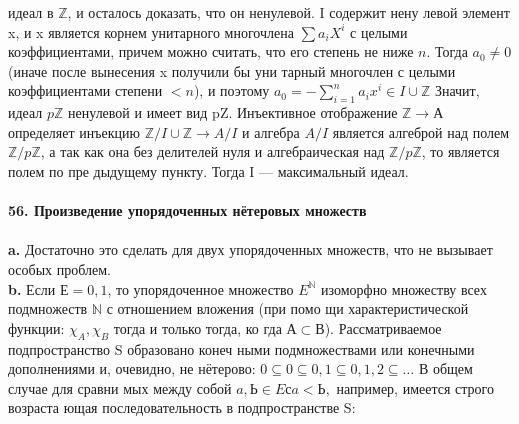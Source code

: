 идеал в $\mathbb{Z}$, и осталось доказать, что он ненулевой. I содержит нену­\linebreak
левой элемент x, и x является корнем унитарного многочлена $\sum a_{i}X^{i}$\linebreak
с целыми коэффициентами, причем можно считать, что его степень\linebreak
не ниже $n$. Тогда $a_0 \neq 0$ (иначе после вынесения x получили бы уни­\linebreak
тарный многочлен с целыми коэффициентами степени $< n$), и поэтому\linebreak
$a_0 = - \sum^{n}_{i = 1}a_{i}x^{i} \in I \cup \mathbb{Z}$ Значит, идеал $p\mathbb{Z}$ ненулевой и имеет вид pZ.\linebreak
Инъективное отображение $\mathbb{Z} \rightarrow А$ определяет инъекцию $\mathbb{Z}/I\cup\mathbb{Z} \rightarrow A/I$\linebreak
и алгебра $A/I$ является алгеброй над полем $\mathbb{Z}/p\mathbb{Z}$, а так как она без\linebreak
делителей нуля и алгебраическая над $\mathbb{Z}/p\mathbb{Z}$, то является полем по пре­\linebreak
дыдущему пункту. Тогда I --- максимальный идеал.\\
\\
\noindent\textbf{56. Произведение упорядоченных нётеровых множеств}\\
\\
\hspace*{15pt}\textbf{a.} Достаточно это сделать для двух упорядоченных множеств, что\linebreak
не вызывает особых проблем.\\
\hspace*{15pt}\textbf{b.} Если $Е = {0,1}$, то упорядоченное множество $E^{\mathbb{N}}$ изоморфно\linebreak
множеству всех подмножеств $\mathbb{N}$ с отношением вложения (при помо­\linebreak
щи характеристической функции: $\chi_A, \chi_B$ тогда и только тогда, ко­\linebreak
гда $А \subset В$). Рассматриваемое подпространство S образовано конеч­\linebreak
ными подмножествами или конечными дополнениями и, очевидно, не\linebreak
нётерово: $0 \subseteq {0} \subseteq {0,1} \subseteq {0,1,2} \subseteq\ldots$ В общем случае для сравни­\linebreak
мых между собой $a, Ь \in E с a < Ь,$ например, имеется строго возраста­\linebreak
ющая последовательность в подпространстве S:

